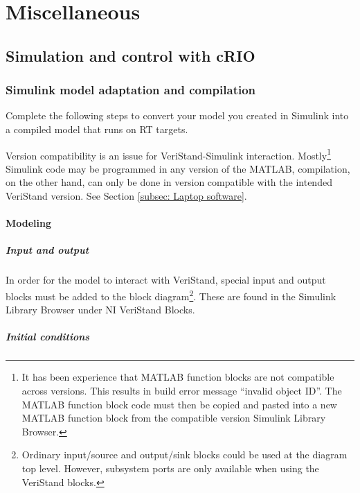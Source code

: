 \documentclass[a4paper,twoside,english]{report}
\begin{document}
\appendix

\part{Miscellaneous }

\chapter{Simulation and control with cRIO}

\section{Simulink model adaptation and compilation}

Complete the following steps to convert your model you created in
Simulink into a compiled model that runs on RT targets.

Version compatibility is an issue for VeriStand-Simulink interaction.
Mostly\footnote{It has been experience that MATLAB function blocks are not compatible
across versions. This results in build error message ``invalid object
ID''. The MATLAB function block code must then be copied and pasted
into a new MATLAB function block from the compatible version Simulink
Library Browser.} Simulink code may be programmed in any version of the MATLAB, compilation,
on the other hand, can only be done in version compatible with the
intended VeriStand version. See Section \ref{subsec: Laptop software}.

\subsection{\label{subsec: Simulink modeling}Modeling}

\subsubsection{Input and output}

In order for the model to interact with VeriStand, special input and
output blocks must be added to the block diagram\footnote{Ordinary input/source and output/sink blocks could be used at the
diagram top level. However, subsystem ports are only available when
using the VeriStand blocks.}. These are found in the Simulink Library Browser under NI VeriStand
Blocks.

\subsubsection{Initial conditions}
\end{document}
